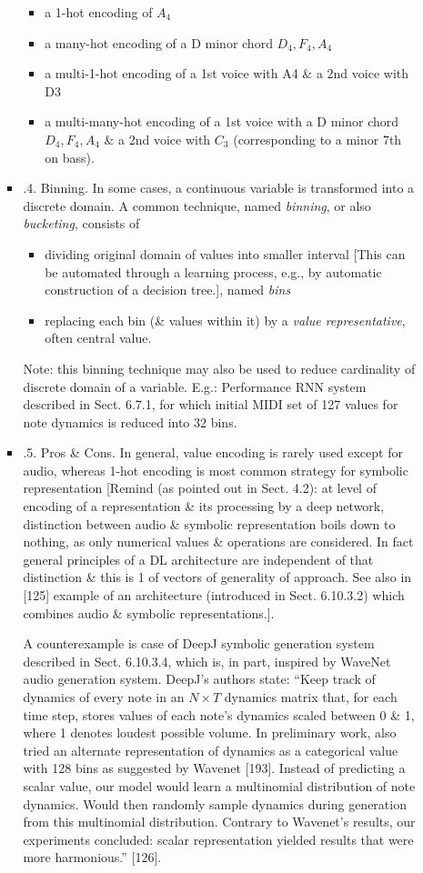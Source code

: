 \documentclass{article}
\begin{document}
\begin{itemize}
\begin{itemize}
\begin{itemize}
\begin{itemize}
				\item a 1-hot encoding of $A_4$
				\item a many-hot encoding of a D minor chord $D_4,F_4,A_4$
				\item a multi-1-hot encoding of a 1st voice with A4 \& a 2nd voice with D3
				\item a multi-many-hot encoding of a 1st voice with a D minor chord $D_4,F_4,A_4$ \& a 2nd voice with $C_3$ (corresponding to a minor 7th on bass).
			\end{itemize}
			\item {.4. Binning.} In some cases, a continuous variable is transformed into a discrete domain. A common technique, named {\it binning}, or also {\it bucketing}, consists of
			\begin{itemize}
				\item dividing original domain of values into smaller interval [This can be automated through a learning process, e.g., by automatic construction of a decision tree.], named {\it bins}
				\item replacing each bin (\& values within it) by a {\it value representative}, often central value.
			\end{itemize}
			Note: this binning technique may also be used to reduce cardinality of discrete domain of a variable. E.g.: Performance RNN system described in Sect. 6.7.1, for which initial MIDI set of 127 values for note dynamics is reduced into 32 bins.
			\item {.5. Pros \& Cons.} In general, value encoding is rarely used except for audio, whereas 1-hot encoding is most common strategy for symbolic representation [Remind (as pointed out in Sect. 4.2): at level of encoding of a representation \& its processing by a deep network, distinction between audio \& symbolic representation boils down to nothing, as only numerical values \& operations are considered. In fact general principles of a DL architecture are independent of that distinction \& this is 1 of vectors of generality of approach. See also in [125] example of an architecture (introduced in Sect. 6.10.3.2) which combines audio \& symbolic representations.].
			
			A counterexample is case of DeepJ symbolic generation system described in Sect. 6.10.3.4, which is, in part, inspired by WaveNet audio generation system. DeepJ's authors state: ``Keep track of dynamics of every note in an $N\times T$ dynamics matrix that, for each time step, stores values of each note's dynamics scaled between 0 \& 1, where 1 denotes loudest possible volume. In preliminary work, also tried an alternate representation of dynamics as a categorical value with 128 bins as suggested by Wavenet [193]. Instead of predicting a scalar value, our model would learn a multinomial distribution of note dynamics. Would then randomly sample dynamics during generation from this multinomial distribution. Contrary to Wavenet's results, our experiments concluded: scalar representation yielded results that were more harmonious.'' [126].
			

\end{itemize}
\end{itemize}
\end{itemize}
\end{document}
